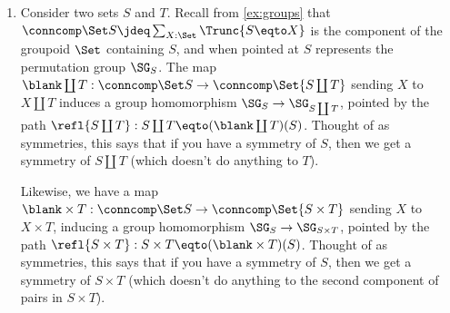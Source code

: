 \begin{example}%
  \label{ex:groups-morphisms}%
  \leavevmode
  \begin{enumerate}
  \item Consider two sets $S$ and $T$.  Recall from \cref{ex:groups}
    that $\conncomp \Set S \jdeq\sum_{X:\Set}\Trunc{S \eqto X}$ is the component
    of the groupoid $\Set$ containing $S$, and when pointed at $S$
    represents the permutation group $\SG_S$.  The map
    $\blank\coprod T:\conncomp \Set S \to \conncomp \Set {S\coprod T}$ sending $X$ to $X\coprod T$
    induces a group homomorphism $\SG_S\to\SG_{S\coprod T}$,
    pointed by the path $\refl {S\coprod T}:S\coprod T \eqto (\blank\coprod T)(S)$.
    Thought of as symmetries, this says that if you have a symmetry of
    $S$, then we get a symmetry of $S\coprod T$ (which doesn't do
    anything to $T$).

    Likewise, we have a map
    $\blank\times T:\conncomp \Set S \to \conncomp\Set {S\times T}$ sending $X$ to
    $X\times T$, inducing a group homomorphism
    $\SG_S\to\SG_{S\times T}$, pointed by the path
    $\refl {S\times T}: {S\times T} \eqto (\blank \times T)(S)$.
    Thought of as symmetries, this says that if you have a symmetry of
    $S$, then we get a symmetry of $S\times T$ (which doesn't do
    anything to the second component of pairs in $S\times T$).


\end{enumerate}
\end{example}
